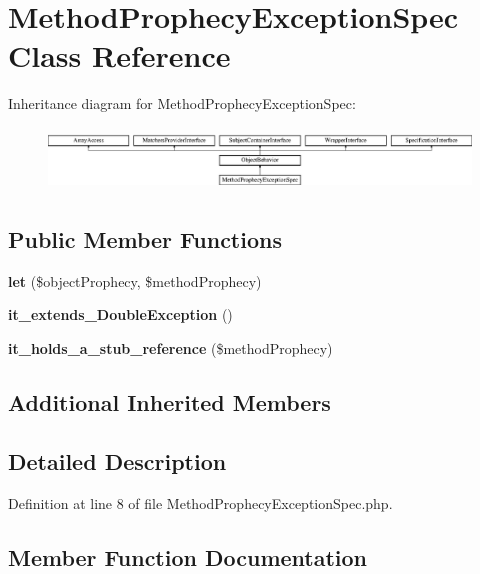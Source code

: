 \section{Method\+Prophecy\+Exception\+Spec Class Reference}
\label{classspec_1_1_prophecy_1_1_exception_1_1_prophecy_1_1_method_prophecy_exception_spec}
Inheritance diagram for Method\+Prophecy\+Exception\+Spec\+:\begin{figure}[H]
\begin{center}
\leavevmode
\includegraphics[height=1.671642cm]{classspec_1_1_prophecy_1_1_exception_1_1_prophecy_1_1_method_prophecy_exception_spec}
\end{center}
\end{figure}
\subsection*{Public Member Functions}
\begin{DoxyCompactItemize}
\item 
{\bf let} (\$object\+Prophecy, \$method\+Prophecy)
\item 
{\bf it\+\_\+extends\+\_\+\+Double\+Exception} ()
\item 
{\bf it\+\_\+holds\+\_\+a\+\_\+stub\+\_\+reference} (\$method\+Prophecy)
\end{DoxyCompactItemize}
\subsection*{Additional Inherited Members}


\subsection{Detailed Description}


Definition at line 8 of file Method\+Prophecy\+Exception\+Spec.\+php.



\subsection{Member Function Documentation}
